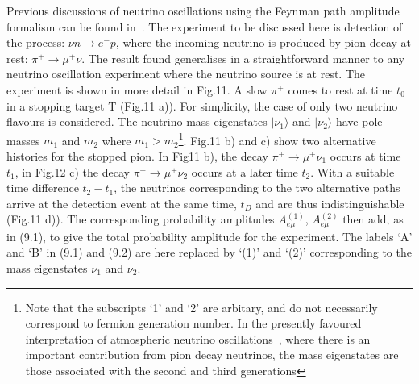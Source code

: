 \documentclass [12pt]{article}
\begin{document}
{ \par Previous discussions of neutrino oscillations using the Feynman path amplitude formalism
  can be found in~\cite{JHF1,JHF2,JHF3}. The experiment to be discussed here is detection of the
  process: $ \nu n \rightarrow e^- p$, where the incoming neutrino is produced by pion decay at rest:
   $\pi^+ \rightarrow \mu^+ \nu$. The result found generalises in a straightforward manner to 
  any neutrino oscillation experiment where the neutrino source is at rest.  The experiment
  is shown in more detail in Fig.11. A slow $\pi^+$ comes to rest at time $t_0$ in a stopping
  target T (Fig.11 a)). For simplicity, the case of only two neutrino flavours is considered. The neutrino
  mass eigenstates $|\nu_1\rangle$ and $|\nu_2\rangle$ have pole masses $m_1$ and $m_2$ where
   $m_1 > m_2$\footnote{ Note that the subscripts `1' and `2' are arbitary, and do not necessarily
   correspond to fermion generation number. In the presently favoured interpretation of
    atmospheric neutrino oscillations~\cite{Kays04}, where there is an important
   contribution from pion decay neutrinos, the mass eigenstates are those 
  associated with the second and third generations}.
   Fig.11 b) and c) show two alternative histories for the stopped pion. 
   In Fig11 b), the decay  $\pi^+ \rightarrow \mu^+ \nu_1$ occurs at time $t_1$, in Fig.12 c) 
    the decay $\pi^+ \rightarrow \mu^+ \nu_2$ occurs at a later time $t_2$. With a suitable 
   time difference $t_2-t_1$, the neutrinos corresponding to the two alternative
  paths arrive at the detection event at the same time, $t_D$ and are thus indistinguishable
  (Fig.11 d)). The corresponding probability amplitudes $A_{e\mu}^{(1)}$,  $A_{e\mu}^{(2)}$
   then add, as in (9.1), to give the total probability amplitude for the experiment.
   The labels `A' and `B' in (9.1) and (9.2) are here replaced by `(1)' and `(2)' corresponding
    to the mass eigenstates $\nu_1$ and  $\nu_2$.

}
\end{document}
